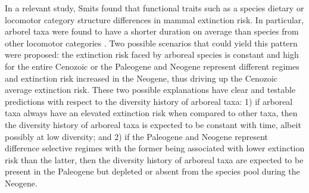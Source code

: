 In a relevant study, Smits \citep{Smits2015b} found that functional traits such as a species dietary or locomotor category structure differences in mammal extinction risk. In particular, arborel taxa were found to have a shorter duration on average than species from other locomotor categories \citep{Smits2015b}. Two possible scenarios that could yield this pattern were proposed: the extinction risk faced by arboreal species is constant and high for the entire Cenozoic or the Paleogene and Neogene represent different regimes and extinction risk increased in the Neogene, thus driving up the Cenozoic average extinction risk. These two possible explanations have clear and testable predictions with respect to the diversity history of arboreal taxa: 1) if arboreal taxa always have an elevated extinction risk when compared to other taxa, then the diversity history of arboreal taxa is expected to be constant with time, albeit possibly at low diversity; and 2) if the Paleogene and Neogene represent difference selective regimes with the former being associated with lower extinction risk than the latter, then the diversity history of arboreal taxa are expected to be present in the Paleogene but depleted or absent from the species pool during the Neogene.


